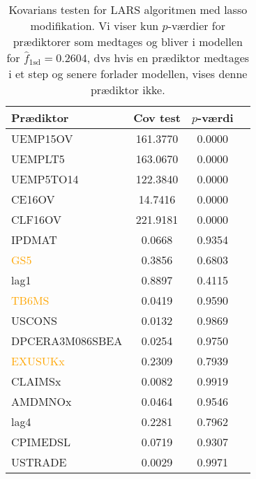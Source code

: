 \begin{table}[ht] 
\centering 
\begin{tabular}{lccc}
\toprule
Prædiktor & Cov test & \(p\)-værdi \\
\midrule
\textcolor{blue3}{UEMP15OV}    &       161.3770  &0.0000\\
\textcolor{blue3}{UEMPLT5}   &      163.0670 & 0.0000\\
\textcolor{blue3}{UEMP5TO14}    &    122.3840&  0.0000\\
\textcolor{blue3}{CE16OV}         &   14.7416 & 0.0000\\
\textcolor{blue3}{CLF16OV}        &   221.9181 & 0.0000\\
\textcolor{chartreuse4}{IPDMAT}         &    0.0668&  0.9354\\
\textcolor{orange}{GS5}&   0.3856 & 0.6803\\
\textcolor{blue3}{lag1}       &      0.8897 & 0.4115\\
\textcolor{orange}{TB6MS}  &    0.0419 & 0.9590\\
\textcolor{blue3}{USCONS} &    0.0132&  0.9869\\
\textcolor{blue3}{ DPCERA3M086SBEA}          &  0.0254 & 0.9750\\
\textcolor{orange}{ EXUSUKx} &     0.2309 & 0.7939\\
\textcolor{blue3}{CLAIMSx} &      0.0082 &  0.9919\\
\textcolor{red3}{ AMDMNOx}  &     0.0464 & 0.9546\\
\textcolor{blue3}{lag4 }     &    0.2281&  0.7962\\
\textcolor{cadetblue2}{CPIMEDSL}  &   0.0719&  0.9307\\
\textcolor{blue3}{USTRADE}   &     0.0029 &  0.9971\\ \bottomrule
\end{tabular}
\caption{Kovarians testen for LARS algoritmen med lasso modifikation.
Vi viser kun \(p\)-værdier for prædiktorer som medtages og bliver i modellen for \(\widehat{f}_{1\text{sd}}=0.2604\), dvs hvis en prædiktor medtages i et step og senere forlader modellen, vises denne prædiktor ikke.} \label{tab:covTest_bic}
\end{table} 

